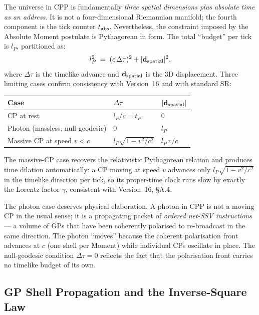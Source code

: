 \documentclass[12pt]{article}
\begin{document}
The universe in CPP is fundamentally \emph{three spatial dimensions plus
absolute time as an address}.  It is not a four-dimensional Riemannian
manifold; the fourth component is the tick counter $t_{\rm abs}$.
Nevertheless, the constraint imposed by the Absolute Moment postulate is
Pythagorean in form.  The total ``budget'' per tick is $l_P$, partitioned as:
\begin{equation}
  l_P^2 \;=\; (c\,\Delta\tau)^2 + |\mathbf{d}_{\rm spatial}|^2,
  \label{eq:budget}
\end{equation}
where $\Delta\tau$ is the timelike advance and $\mathbf{d}_{\rm spatial}$ is
the 3D displacement.  Three limiting cases confirm consistency with
Version~16 and with standard SR:

\begin{center}
\begin{tabular}{@{}lll@{}}
\toprule
Case & $\Delta\tau$ & $|\mathbf{d}_{\rm spatial}|$ \\
\midrule
CP at rest & $l_P/c = t_P$ & $0$ \\
Photon (massless, null geodesic) & $0$ & $l_P$ \\
Massive CP at speed $v < c$ &
  $l_P\sqrt{1-v^2/c^2}$ & $l_P\,v/c$ \\
\bottomrule
\end{tabular}
\end{center}

The massive-CP case recovers the relativistic Pythagorean relation and
produces time dilation automatically: a CP moving at speed $v$ advances only
$l_P\sqrt{1-v^2/c^2}$ in the timelike direction per tick, so its proper-time
clock runs slow by exactly the Lorentz factor $\gamma$, consistent with
Version~16, \S A.4.

The photon case deserves physical elaboration.  A photon in CPP is not a
moving CP in the usual sense; it is a propagating packet of
\emph{ordered net-SSV instructions} --- a volume of GPs that have been
coherently polarised to re-broadcast in the same direction.  The photon
``moves'' because the coherent polarisation front advances at $c$ (one shell
per Moment) while individual CPs oscillate in place.  The null-geodesic
condition $\Delta\tau = 0$ reflects the fact that the polarisation front
carries no timelike budget of its own.

\subsection{GP Shell Propagation and the Inverse-Square Law}
\end{document}
